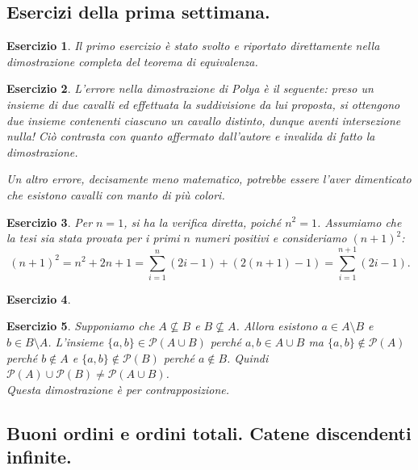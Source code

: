 \documentclass[fontsize = 11 pt, paper=A4, oneside, index=totoc, hyperref]{article}
\theoremstyle{definition}
\theoremstyle{plain}
\newtheorem{exe}{Esercizio}[section]
\begin{document}
\subsection{Esercizi della prima settimana.}
\begin{exe}
  Il primo esercizio è stato svolto e riportato direttamente nella dimostrazione completa del teorema di equivalenza.
\end{exe}
\begin{exe}
  L'errore nella dimostrazione di Polya è il seguente: preso un insieme di due cavalli ed effettuata la suddivisione da lui proposta, si ottengono due insieme contenenti ciascuno un cavallo distinto, dunque aventi intersezione nulla! Ciò contrasta con quanto affermato dall'autore e invalida di fatto la dimostrazione.

  Un altro errore, decisamente meno matematico, potrebbe essere l'aver dimenticato che esistono cavalli con manto di più colori.
\end{exe}
\begin{exe}
  Per \(n = 1\), si ha la verifica diretta, poiché \(n^2 = 1\). Assumiamo che la tesi sia stata provata per i primi \(n\) numeri positivi e consideriamo \((n+1)^2\):
  \begin{equation}
    (n+1)^2 = n^2 + 2n + 1 = \sum_{i=1}^n (2i - 1) + (2(n + 1) - 1) = \sum_{i = 1}^{n+1}(2i - 1).
  \end{equation}
\end{exe}
\begin{exe}
\end{exe}

\begin{exe}
Supponiamo che $A \not\subseteq B$ e $B \not\subseteq A$. Allora esistono $a \in A\setminus B$ e $b\in B\setminus A$. L'insieme $\{ a,b\} \in \mathcal{P} (A\cup B)$ perché $a,b\in A\cup B$ ma $\{ a,b\} \not\in \mathcal{P} (A)$ perché $b \not\in A$ e $\{ a,b\} \not\in \mathcal{P} (B)$ perché $a \not\in B$. Quindi $\mathcal{P} (A) \cup \mathcal{P} (B) \not = \mathcal{P} (A\cup B)$. \\
Questa dimostrazione è per contrapposizione.
\end{exe}

\subsection{Buoni ordini e ordini totali. Catene discendenti infinite.}
\end{document}
